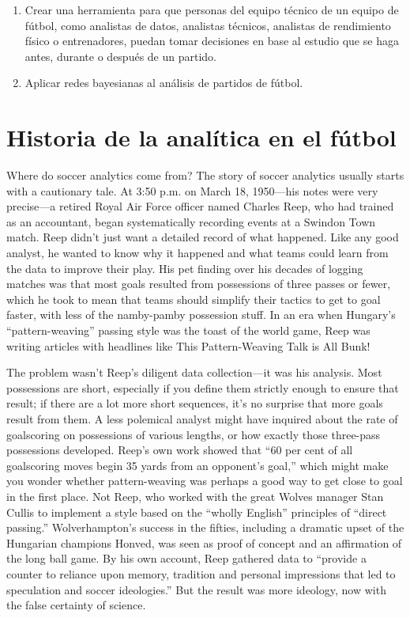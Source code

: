 \begin{enumerate}
    \item \label{obj:1} Crear una herramienta para que personas del equipo técnico de
    un equipo de fútbol, como analistas de datos, analistas técnicos, analistas de rendimiento 
    físico o entrenadores, puedan tomar decisiones en base al estudio que se haga antes, durante 
    o después de un partido. 
    \item \label{obj:2} Aplicar redes bayesianas al análisis de partidos de fútbol.
\end{enumerate}

\section{Historia de la analítica en el fútbol}
Where do soccer analytics come from?
The story of soccer analytics usually starts with a cautionary tale. At 3:50 
p.m. on March 18, 1950—his notes were very precise—a retired Royal Air Force 
officer named Charles Reep, who had trained as an accountant, began 
systematically recording events at a Swindon Town match. Reep didn’t just 
want a detailed record of what happened. Like any good analyst, he wanted 
to know why it happened and what teams could learn from the data to 
improve their play. His pet finding over his decades of logging matches 
was that most goals resulted from possessions of three passes or fewer, 
which he took to mean that teams should simplify their tactics to get 
to goal faster, with less of the namby-pamby possession stuff. In an 
era when Hungary’s “pattern-weaving” passing style was the toast of 
the world game, Reep was writing articles with headlines like This 
Pattern-Weaving Talk is All Bunk!

The problem wasn’t Reep’s diligent data collection—it was his analysis. Most 
possessions are short, especially if you define them strictly enough to 
ensure that result; if there are a lot more short sequences, it’s no 
surprise that more goals result from them. A less polemical analyst 
might have inquired about the rate of goalscoring on possessions of various 
lengths, or how exactly those three-pass possessions developed. Reep’s own 
work showed that “60 per cent of all goalscoring moves begin 35 yards from 
an opponent’s goal,” which might make you wonder whether pattern-weaving was 
perhaps a good way to get close to goal in the first place. Not Reep, who 
worked with the great Wolves manager Stan Cullis to implement a style based 
on the “wholly English” principles of “direct passing.” Wolverhampton’s 
success in the fifties, including a dramatic upset of the Hungarian 
champions Honved, was seen as proof of concept and an affirmation of the 
long ball game. By his own account, Reep gathered data to “provide a 
counter to reliance upon memory, tradition and personal impressions 
that led to speculation and soccer ideologies.” But the result was 
more ideology, now with the false certainty of science.


